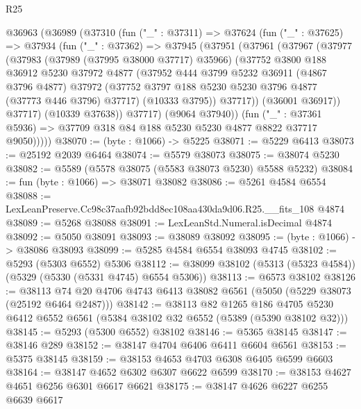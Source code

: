 \begin{lexlean}{R25}
\begin{coremodule}
  @36963
    (@36989
      (@37310
        (fun ("_" : @37311) =>
        @37624
          (fun ("_" : @37625) =>
          @37934
            (fun ("_" : @37362) =>
            @37945
              (@37951
                (@37961
                  (@37967
                    (@37977
                      (@37983
                        (@37989 (@37995 @38000 @37717) @35966)
                        (@37752
                          @3800
                          @188
                          @36912
                          @5230
                          @37972
                          @4877
                          (@37952
                            @444
                            @3799
                            @5232
                            @36911
                            (@4867 @3796 @4877)
                            @37972
                            (@37752 @3797 @188 @5230 @5230 @3796 @4877 (@37773 @446 @3796) @37717)
                            (@10333 @3795))
                          @37717))
                      (@36001 @36917))
                    @37717)
                  (@10339 @37638))
                @37717)
              (@9064 @37940))
            (fun ("_" : @37361 @5936) =>
            @37709 @318 @84 @188 @5230 @5230 @4877 @8822 @37717 @9050)))))
@38070 := (byte : @1066) -> @5225
@38071 := @5229 @6413
@38073 := @25192 @2039 @6464
@38074 := @5579 @38073
@38075 := @38074 @5230
@38082 := @5589 (@5578 @38075 (@5583 @38073 @5230) @5588 @5232)
@38084 := fun (byte : @1066) => @38071 @38082
@38086 := @5261 @4584 @6554
@38088 := LexLeanPreserve.Cc98c37aafb92bdd8ec108aa430da9d06.R25.__fits_108 @4874
@38089 := @5268 @38088
@38091 := LexLeanStd.Numeral.isDecimal @4874
@38092 := @5050 @38091
@38093 := @38089 @38092
@38095 := (byte : @1066) -> @38086 @38093
@38099 := @5285 @4584 @6554 @38093 @4745
@38102 := @5293 (@5303 @6552) @5306
@38112 := @38099 @38102 (@5313 (@5323 @4584)) (@5329 (@5330 (@5331 @4745) @6554 @5306))
@38113 := @6573 @38102
@38126 := @38113 @74 @20 @4706 @4743 @6413 @38082 @6561 (@5050 (@5229 @38073 (@25192 @6464 @2487)))
@38142 := @38113
    @82
    @1265
    @186
    @4705
    @5230
    @6412
    @6552
    @6561
    (@5384 @38102 @32 @6552 (@5389 (@5390 @38102 @32)))
@38145 := @5293 (@5300 @6552) @38102
@38146 := @5365 @38145
@38147 := @38146 @289
@38152 := @38147 @4704 @6406 @6411 @6604 @6561
@38153 := @5375 @38145
@38159 := @38153 @4653 @4703 @6308 @6405 @6599 @6603
@38164 := @38147 @4652 @6302 @6307 @6622 @6599
@38170 := @38153 @4627 @4651 @6256 @6301 @6617 @6621
@38175 := @38147 @4626 @6227 @6255 @6639 @6617

\end{coremodule}
\end{lexlean}
